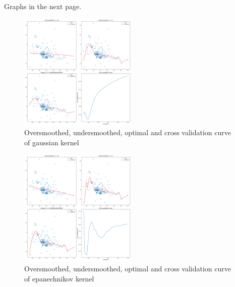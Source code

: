 Graphs in the next page.
\begin{figure}[H]
	\centering
	\includegraphics[width=0.5\textwidth]{../images/4/gaussian_kernel_regression.png}
	\caption{Oversmoothed, undersmoothed, optimal and cross validation curve of gaussian kernel}
\end{figure}

\begin{figure}[H]
	\centering
	\includegraphics[width=0.5\textwidth]{../images/4/epanechnikov_kernel_regression.png}
	\caption{Oversmoothed, undersmoothed, optimal and cross validation curve of epanechnikov kernel}
\end{figure}
